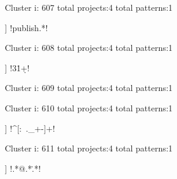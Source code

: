 Cluster i: 607
total projects:4
total patterns:1
\begin{multicols}{1}
\begin{description}[noitemsep,topsep=0pt]
\item [[4] ] \cverb!publish.*!
\end{description}
\end{multicols}







Cluster i: 608
total projects:4
total patterns:1
\begin{multicols}{1}
\begin{description}[noitemsep,topsep=0pt]
\item [[4] ] \cverb!3\.1\d+!
\end{description}
\end{multicols}







Cluster i: 609
total projects:4
total patterns:1
\begin{multicols}{1}
\end{multicols}







Cluster i: 610
total projects:4
total patterns:1
\begin{multicols}{1}
\begin{description}[noitemsep,topsep=0pt]
\item [[4] ] \cverb!^[:~._+-]+!
\end{description}
\end{multicols}







Cluster i: 611
total projects:4
total patterns:1
\begin{multicols}{1}
\begin{description}[noitemsep,topsep=0pt]
\item [[4] ] \cverb!.*@.*\..*!
\end{description}
\end{multicols}







